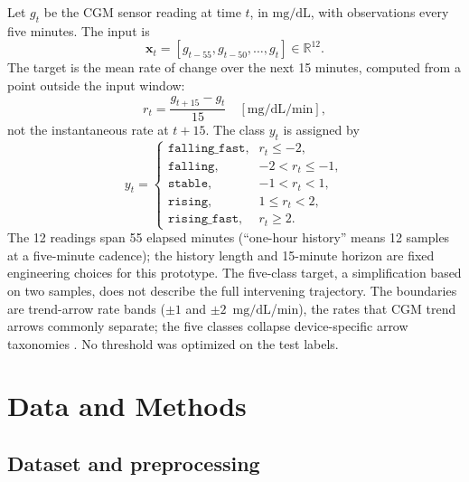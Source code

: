 \documentclass[10pt,twocolumn]{article}
\newcommand{\mgdl}{\ensuremath{\mathrm{mg/dL}}}
\begin{document}
Let $g_t$ be the CGM sensor reading at time $t$, in \mgdl, with observations
every five minutes. The input is
\begin{equation}
    \mathbf{x}_t = [g_{t-55}, g_{t-50}, \ldots, g_t] \in \mathbb{R}^{12}.
\end{equation}
The target is the mean rate of change over the next 15 minutes, computed
from a point outside the input window:
\begin{equation}
    r_t = \frac{g_{t+15}-g_t}{15}\quad [\mgdl/\mathrm{min}],
\end{equation}
not the instantaneous rate at $t+15$. The class $y_t$ is assigned by
\begin{equation}
y_t =
\begin{cases}
\texttt{falling\_fast}, & r_t \leq -2,\\
\texttt{falling},       & -2 < r_t \leq -1,\\
\texttt{stable},        & -1 < r_t < 1,\\
\texttt{rising},        & 1 \leq r_t < 2,\\
\texttt{rising\_fast}, & r_t \geq 2.
\end{cases}
\end{equation}
The 12 readings span 55 elapsed minutes (``one-hour history'' means 12
samples at a five-minute cadence); the history length and 15-minute horizon
are fixed engineering choices for this prototype. The five-class target, a
simplification based on two samples, does not describe the full intervening
trajectory. The boundaries are trend-arrow rate bands ($\pm1$ and $\pm2$~\mgdl/min),
the rates that CGM trend arrows commonly separate; the five classes
collapse device-specific arrow taxonomies
\cite{pettus2017recommendations,rodacki2021trend}. No threshold was
optimized on the test labels.

\section{Data and Methods}

\subsection{Dataset and preprocessing}
\end{document}
